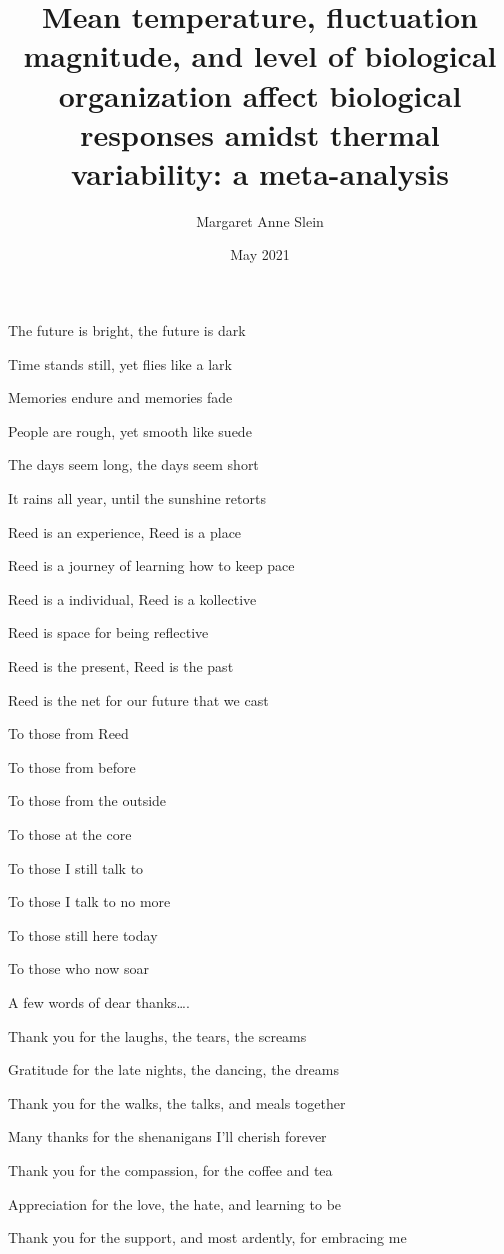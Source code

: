 \documentclass[12pt,twoside]{reedthesis}
\title{Mean temperature, fluctuation magnitude, and level of biological organization affect biological responses amidst thermal variability: a meta-analysis}
\author{Margaret Anne Slein}
\date{May 2021}
\begin{document}
  \maketitle

\frontmatter %
\pagestyle{empty} %
  \begin{acknowledgements}
    The future is bright, the future is dark
    
    Time stands still, yet flies like a lark
    
    Memories endure and memories fade
    
    People are rough, yet smooth like suede
    
    The days seem long, the days seem short
    
    It rains all year, until the sunshine retorts
    
    Reed is an experience, Reed is a place
    
    Reed is a journey of learning how to keep pace
    
    Reed is a individual, Reed is a kollective
    
    Reed is space for being reflective
    
    Reed is the present, Reed is the past
    
    Reed is the net for our future that we cast
    
    To those from Reed
    
    To those from before
    
    To those from the outside
    
    To those at the core
    
    To those I still talk to
    
    To those I talk to no more
    
    To those still here today
    
    To those who now soar
    
    A few words of dear thanks\ldots{}.
    
    Thank you for the laughs, the tears, the screams
    
    Gratitude for the late nights, the dancing, the dreams
    
    Thank you for the walks, the talks, and meals together
    
    Many thanks for the shenanigans I'll cherish forever
    
    Thank you for the compassion, for the coffee and tea
    
    Appreciation for the love, the hate, and learning to be
    
    Thank you for the support, and most ardently, for embracing me
  \end{acknowledgements}
\end{document}
